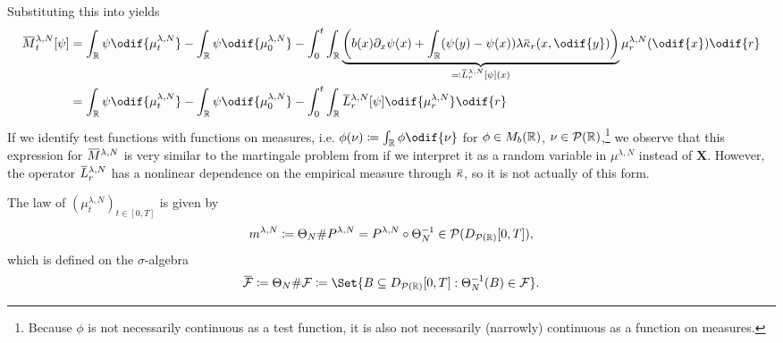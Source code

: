 Substituting this into  yields
\begin{equation}
  \begin{split}
    \ol{M}_t^{\lambda, N}[\psi]
     & = \int_\potspace \psi \odif{\mu_t^{\lambda, N}} - \int_\potspace \psi \odif{\mu_0^{\lambda, N}}
    - \int_0^t \int_\potspace \underbrace{\br*{ b(x) \partial_x \psi(x) + \int_\potspace (\psi(y) - \psi(x)) \lambda \ol{\kappa}_r(x, \odif{y}) }}_{\eqqcolon \ol{L}_r^{\lambda, N} [\psi](x)} \mu_{r}^{\lambda, N}(\odif{x}) \odif{r} \\
    & = \int_\potspace \psi \odif{\mu_t^{\lambda, N}} - \int_\potspace \psi \odif{\mu_0^{\lambda, N}}
    - \int_0^t \int_\potspace \ol{L}_r^{\lambda, N} [\psi] \odif{\mu_{r}^{\lambda, N}} \odif{r} \\
  \end{split}
\end{equation}
If we identify test functions with functions on measures, i.e. \( \phi(\nu) \coloneqq \int_\potspace \phi \odif{\nu} \) for \(\phi \in M_b(\mathbb{R})\), \( \nu \in \mathcal{P}(\mathbb{R}) \),\footnote{Because \(\phi\) is not necessarily continuous as a test function, it is also not necessarily (narrowly) continuous as a function on measures.} we observe that this expression for \(\ol{M}^{\lambda,N}\) is very similar to the martingale problem from  if we interpret it as a random variable in \(\mu^{\lambda,N}\) instead of \(\bm{X}\).
However, the operator \(\ol{L}_r^{\lambda, N}\) has a nonlinear dependence on the empirical measure through \(\ol{\kappa}\), so it is not actually of this form.

\bigskip


The law of \((\mu_t^{\lambda, N})_{t\in[0,T]}\) is given by
\begin{equation}
  m^{\lambda,N} \coloneqq \Theta_N \# P^{\lambda, N} = P^{\lambda, N} \circ \Theta_N^{-1} \in \mathcal{P}(D_{\mathcal{P}(\mathbb{R})}[0,T]),
\end{equation}
which is defined on the \( \sigma \)-algebra
\begin{equation}
  \ol{\cF} \coloneqq \Theta_N \# \cF \coloneqq \Set{B \subseteq D_{\cP(\potspace)}[0,T] : \Theta_N^{-1}(B) \in \cF}.
\end{equation}

